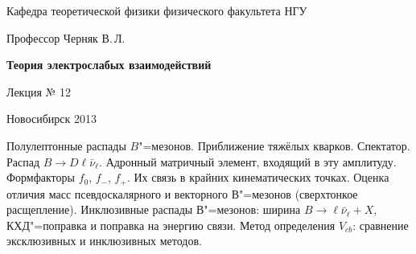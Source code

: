 \documentclass[12pt,pagesize,paper=192mm:108mm]{scrbook}
\begin{document}
\begin{titlepage}
\begin{center}
    Кафедра теоретической физики физического факультета НГУ
    \medskip

    \Large
    Профессор Черняк В.\,Л.
    \bigskip

    \huge
    \textbf{Теория электрослабых взаимодействий}
    \bigskip

    \Large
    Лекция № 12
    \vfill

    \vfill

\normalsize    Новосибирск 2013
  \smallskip

  \ccbysa
  \end{center}
\end{titlepage}
\newpage

\vspace*{-1em}
\begin{center}
 \vfill
  \begin{minipage}{0.66\linewidth}
    Полулептонные распады $B$"=мезонов. Приближение тяжёлых
    кварков. Спектатор.  Распад $B\to D\ell\bar{\nu}_{\ell}$.
    Адронный матричный элемент, входящий в эту амплитуду. Формфакторы
    $f_0$, $f_-$, $f_+$.  Их связь в крайних кинематических
    точках. Оценка отличия масс псевдоскалярного и векторного
    $В$"=мезонов (сверхтонкое расщепление).  Инклюзивные распады
    $В$"=мезонов: ширина $B\to\ell\bar{\nu}_{\ell}+X$, КХД"=поправка и
    поправка на энергию связи.  Метод определения $V_{cb}$: сравнение
    эксклюзивных и инклюзивных методов.
  \end{minipage}
  \vfill

\end{center}
\end{document}
